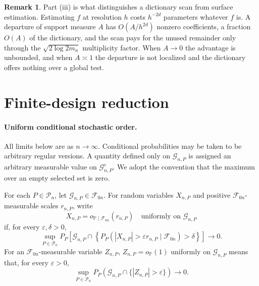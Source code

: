 \documentclass[11pt]{article}
\theoremstyle{definition}
\newtheorem{remark}[definition]{Remark}
\newcommand{\1}{\mathbf 1}\newcommand{\op}{\operatorname}
\begin{document}
\begin{remark}
Part (iii) is what distinguishes a dictionary scan from surface estimation.
Estimating $f$ at resolution $h$ costs $h^{-2d}$ parameters whatever $f$ is.
A departure of support measure $A$ has $O(A/h^{2d})$ nonzero coefficients, a
fraction $O(A)$ of the dictionary, and the scan pays for the unused remainder
only through the $\sqrt{2\log 2m_n}$ multiplicity factor.  When $A\to0$ the
advantage is unbounded, and when $A\asymp1$ the departure is not localized and
the dictionary offers nothing over a global test.
\end{remark}



\section{Finite-design reduction}\label{sec:supp-finite}


\paragraph{Uniform conditional stochastic order.}
All limits below are as $n\to\infty$. Conditional probabilities may
be taken to be arbitrary regular versions. A quantity defined only
on $\mathcal G_{n,P}$ is assigned an arbitrary measurable value on
$\mathcal G_{n,P}^c$. We adopt the convention that the maximum over
an empty selected set is zero.

For each $P\in\mathcal P_n$, let
$\mathcal G_{n,P}\in\mathcal F_{0n}$. For random variables
$X_{n,P}$ and positive $\mathcal F_{0n}$-measurable scales
$r_{n,P}$, write
\[
X_{n,P}
=
o_{\mathbb P\mid\mathcal F_{0n}}(r_{n,P})
\quad\text{uniformly on }\mathcal G_{n,P}
\]
if, for every $\varepsilon,\delta>0$,
\begin{equation}
\sup_{P\in\mathcal P_n}
P_P\!\left[
\mathcal G_{n,P}\cap
\left\{
P_P\!\left(
|X_{n,P}|>\varepsilon r_{n,P}
\mid\mathcal F_{0n}
\right)>\delta
\right\}
\right]
\longrightarrow0.
\label{eq:uniform-conditional-order}
\end{equation}
For an $\mathcal F_{0n}$-measurable variable $Z_{n,P}$,
$Z_{n,P}=o_{\mathbb P}(1)$ uniformly on $\mathcal G_{n,P}$
means that, for every $\varepsilon>0$,
\[
\sup_{P\in\mathcal P_n}
P_P\!\left(
\mathcal G_{n,P}\cap\{|Z_{n,P}|>\varepsilon\}
\right)
\longrightarrow0.
\]
\end{document}
